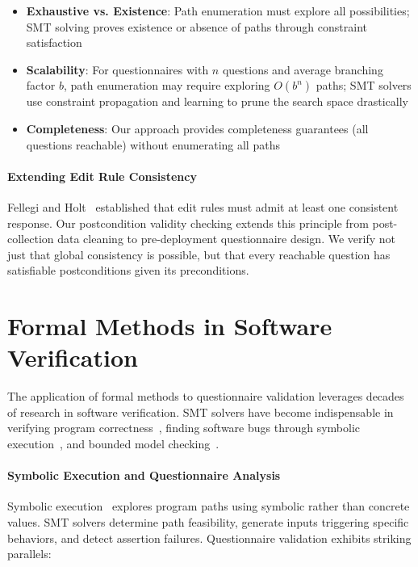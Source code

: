 \begin{itemize}
    \item \textbf{Exhaustive vs. Existence}: Path enumeration must explore all possibilities; SMT solving proves existence or absence of paths through constraint satisfaction
    \item \textbf{Scalability}: For questionnaires with $n$ questions and average branching factor $b$, path enumeration may require exploring $O(b^n)$ paths; SMT solvers use constraint propagation and learning to prune the search space drastically~\cite{nieuwenhuis2006solving}
    \item \textbf{Completeness}: Our approach provides completeness guarantees (all questions reachable) without enumerating all paths
\end{itemize}

\paragraph{Extending Edit Rule Consistency}

Fellegi and Holt~\cite{fellegi1976systematic} established that edit rules must admit at least one consistent response. Our postcondition validity checking extends this principle from post-collection data cleaning to pre-deployment questionnaire design. We verify not just that global consistency is possible, but that every reachable question has satisfiable postconditions given its preconditions.

\section{Formal Methods in Software Verification}

The application of formal methods to questionnaire validation leverages decades of research in software verification. SMT solvers have become indispensable in verifying program correctness~\cite{flanagan2002extended}, finding software bugs through symbolic execution~\cite{king1976symbolic, cadar2013symbolic}, and bounded model checking~\cite{clarke2001bounded}.

\paragraph{Symbolic Execution and Questionnaire Analysis}

Symbolic execution~\cite{king1976symbolic, cadar2013symbolic} explores program paths using symbolic rather than concrete values. SMT solvers determine path feasibility, generate inputs triggering specific behaviors, and detect assertion failures. Questionnaire validation exhibits striking parallels:

